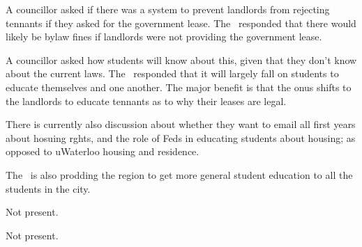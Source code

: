 \begin{information}
    A councillor asked if there was a system to prevent landlords from
    rejecting tennants if they asked for the government lease. The \vpe\
    responded that there would likely be bylaw fines if landlords were not
    providing the government lease. 

    A councillor asked how students will know about this, given that they don't
    know about the current laws. The \vpe\ responded that it will largely fall
    on students to educate themselves and one another. The major benefit is
    that the onus shifts to the landlords to educate tennants as to why their
    leases are legal. 

    There is currently also discussion about whether they want to email all
    first years about hosuing rghts, and the role of Feds in educating students
    about housing; as opposed to uWaterloo housing and residence. 

    The \vped\ is also prodding the region to get more general student 
    education to all the students in the city. 
\end{information}

\begin{information}
    Not present.
\end{information}

\begin{information}
    Not present.
\end{information}

